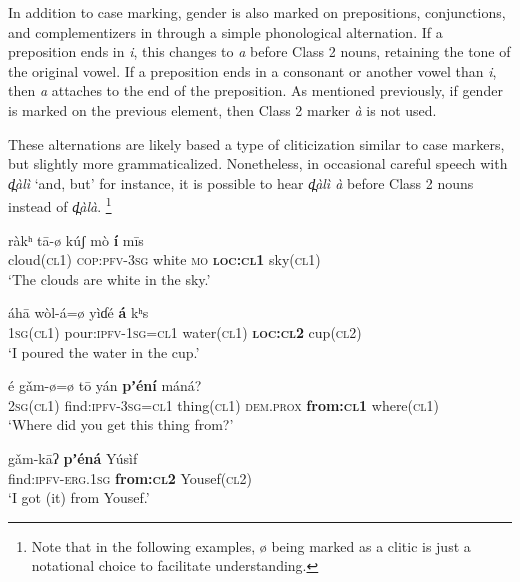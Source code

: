 \documentclass[output=collectionpaper,hidelinks]{langscibook}
\theoremstyle{remark}
\begin{document}
In addition to case marking, gender is also marked on prepositions,
conjunctions, and complementizers in  through a simple phonological
alternation.  If a preposition ends in \emph{i}, this changes to \emph{a} before
Class 2 nouns, retaining the tone of the original vowel.  If a preposition ends
in a consonant or another vowel than \emph{i}, then \emph{a} attaches to the end
of the preposition.  As mentioned previously, if gender is marked on the
previous element, then Class 2 marker \emph{à} is not used.

These alternations are likely based a type of cliticization similar to case
markers, but slightly more grammaticalized.  Nonetheless, in occasional careful
speech with \emph{d̪àlì} `and, but' for instance, it is possible to hear
\emph{d̪àlì à} before Class 2 nouns instead of \emph{d̪àlà}.%
\footnote{Note that in the following examples, ø being marked as a clitic is just a notational
choice to facilitate understanding.}

\ea
\gll  ràkʰ tā-ø kúʃ mò \textbf{í} mīs \\
 cloud(\textsc{cl1}) \textsc{cop}:\textsc{pfv}-\textsc{3sg} white \textsc{mo} \textbf{\textsc{loc:cl1}} sky(\textsc{cl1}) \\
\glt `The clouds are white in the sky.' \\
\z

\ea
\gll  áhā wòl-á=ø yìɗé \textbf{á} kʰ\oMidLow{}\hspace*{-.4mm}s \\
 \textsc{1sg}(\textsc{cl1}) pour:\textsc{ipfv}-\textsc{1sg}=\textsc{cl1} water(\textsc{cl1}) \textbf{\textsc{loc:cl2}} cup(\textsc{cl2}) \\
\glt `I poured the water in the cup.' \\
\z

\ea
\gll  é gǎm-ø=ø tō yán \textbf{pʼéní} máná? \\
 \textsc{2sg}(\textsc{cl1}) find:\textsc{ipfv}-\textsc{3sg}=\textsc{cl1} thing(\textsc{cl1}) \textsc{dem.prox} \textbf{from:\textsc{cl1}} where(\textsc{cl1}) \\
\glt `Where did you get this thing from?' \\
\z

\ea
\gll  gǎm-kāʔ \textbf{pʼéná} Yúsìf \\
 find:\textsc{ipfv}-\textsc{erg.1sg} \textbf{from:\textsc{cl2}} Yousef(\textsc{cl2}) \\
\glt `I got (it) from Yousef.' \\
\z
\end{document}
